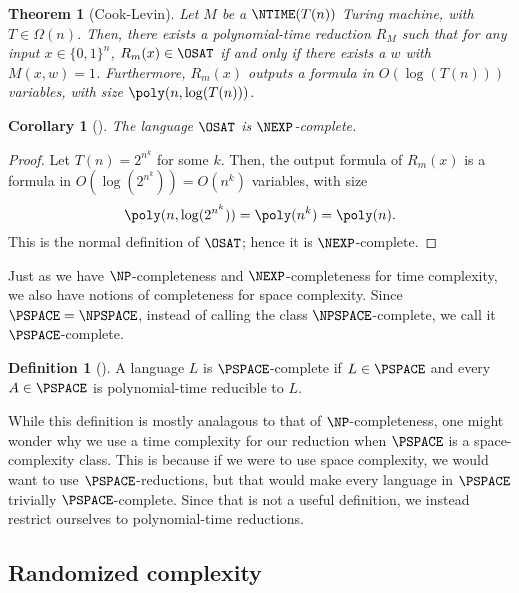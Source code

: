 \documentclass[english,12pt]{reedthesis}
\theoremstyle{plain}
\newtheorem{thm}{Theorem}[section]
\newtheorem{cor}[cor]{Corollary}
\theoremstyle{definition}
\newtheorem{defn}[defn]{Definition}
\theoremstyle{remark}
\begin{document}
\begin{thm}[{Cook-Levin}]\label{thm:cook-levin-general}
  Let $M$ be a $\NTIME(T(n))$ Turing machine, with $T \in \Omega(n)$. Then, there
  exists a polynomial-time reduction $R_{M}$ such that for any input
  $x \in \{0, 1\}^{n}$, $R_{m}(x) \in \OSAT$ if and only if there exists a $w$ with
  $M(x, w) = 1$. Furthermore, $R_{m}(x)$ outputs a formula in $O(\log(T(n)))$
  variables, with size $\poly(n, \log(T(n)))$.
\end{thm}

\begin{cor}[{\cite[Proposition 4.2]{BFL90}}]\label{thm:o3sat-nexp-complete}
  The language $\OSAT$ is $\NEXP$-complete.
\end{cor}

\begin{proof}
  Let $T(n) = 2^{n^{k}}$ for some $k$. Then, the output formula of $R_{m}(x)$ is
  a formula in $O(\log(2^{n^{k}})) = O(n^{k})$ variables, with size
  \begin{equation}
    \poly(n, \log(2^{n^{k}})) = \poly(n^{k}) = \poly(n).
  \end{equation}
  This is the normal definition of $\OSAT$; hence it is $\NEXP$-complete.
\end{proof}

Just as we have $\NP$-completeness and $\NEXP$-completeness for time complexity,
we also have notions of completeness for space complexity. Since
$\PSPACE = \NPSPACE$, instead of calling the class $\NPSPACE$-complete, we call
it $\PSPACE$-complete.

\begin{defn}[{\cite[Def.\ 8.8]{Sip97}}]\label{def:pspace-complete}
  A language $L$ is $\PSPACE$-complete if $L \in \PSPACE$ and every $A \in \PSPACE$
  is polynomial-time reducible to $L$.
\end{defn}

While this definition is mostly analagous to that of $\NP$-completeness, one
might wonder why we use a time complexity for our reduction when $\PSPACE$ is a
space-complexity class. This is because if we were to use space complexity, we
would want to use $\PSPACE$-reductions, but that would make every language in
$\PSPACE$ trivially $\PSPACE$-complete. Since that is not a useful definition,
we instead restrict ourselves to polynomial-time reductions.

\subsection{Randomized complexity}\label{sec:rand-complexity}
\end{document}
